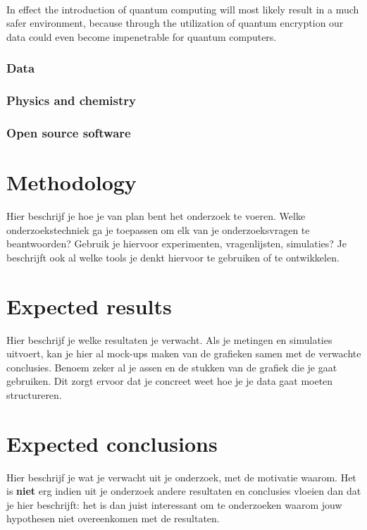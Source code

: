  ~\autocite{Daemen2000} ~\autocite{IBM2019}

In effect the introduction of quantum computing will most likely result in a much safer environment, because through the utilization of quantum encryption our data could even become impenetrable for quantum computers. 
\subsubsection{Data}
\subsubsection{Physics and chemistry}
\subsubsection{Open source software}

\section{Methodology}
\label{sec:methodologie}

Hier beschrijf je hoe je van plan bent het onderzoek te voeren. Welke onderzoekstechniek ga je toepassen om elk van je onderzoeksvragen te beantwoorden? Gebruik je hiervoor experimenten, vragenlijsten, simulaties? Je beschrijft ook al welke tools je denkt hiervoor te gebruiken of te ontwikkelen.

\section{Expected results}
\label{sec:verwachte_resultaten}

Hier beschrijf je welke resultaten je verwacht. Als je metingen en simulaties uitvoert, kan je hier al mock-ups maken van de grafieken samen met de verwachte conclusies. Benoem zeker al je assen en de stukken van de grafiek die je gaat gebruiken. Dit zorgt ervoor dat je concreet weet hoe je je data gaat moeten structureren.

\section{Expected conclusions}
\label{sec:verwachte_conclusies}

Hier beschrijf je wat je verwacht uit je onderzoek, met de motivatie waarom. Het is \textbf{niet} erg indien uit je onderzoek andere resultaten en conclusies vloeien dan dat je hier beschrijft: het is dan juist interessant om te onderzoeken waarom jouw hypothesen niet overeenkomen met de resultaten.

